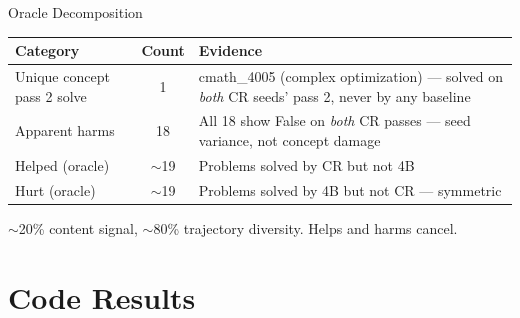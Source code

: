 \documentclass[10pt]{beamer}
\begin{document}
\begin{frame}{Oracle Decomposition}
  \begin{center}
  \end{center}

  \vspace{0.5em}
  \begin{table}
    \scriptsize
    \begin{tabular}{@{} l c p{6cm} @{}}
      \toprule
      Category & Count & Evidence \\
      \midrule
      Unique concept pass 2 solve & 1 & cmath\_4005 (complex optimization) --- solved on \emph{both} CR seeds' pass 2, never by any baseline \\
      Apparent harms & 18 & All 18 show False on \emph{both} CR passes --- seed variance, not concept damage \\
      Helped (oracle) & $\sim$19 & Problems solved by CR but not 4B \\
      Hurt (oracle) & $\sim$19 & Problems solved by 4B but not CR --- symmetric \\
      \bottomrule
    \end{tabular}
  \end{table}

  \vspace{0.3em}
  {\footnotesize $\sim$20\% content signal, $\sim$80\% trajectory diversity. Helps and harms cancel.}
\end{frame}

\section{Code Results}
\end{document}
